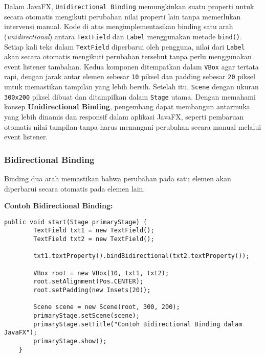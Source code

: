 Dalam JavaFX, \texttt{Unidirectional Binding} memungkinkan suatu properti untuk secara otomatis mengikuti perubahan nilai properti lain tanpa memerlukan intervensi manual. Kode di atas mengimplementasikan binding satu arah (\textit{unidirectional}) antara \texttt{TextField} dan \texttt{Label} menggunakan metode \texttt{bind()}. Setiap kali teks dalam \texttt{TextField} diperbarui oleh pengguna, nilai dari \texttt{Label} akan secara otomatis mengikuti perubahan tersebut tanpa perlu menggunakan event listener tambahan. Kedua komponen ditempatkan dalam \texttt{VBox} agar tertata rapi, dengan jarak antar elemen sebesar \texttt{10} piksel dan padding sebesar \texttt{20} piksel untuk memastikan tampilan yang lebih bersih. Setelah itu, \texttt{Scene} dengan ukuran \texttt{300x200} piksel dibuat dan ditampilkan dalam \texttt{Stage} utama. Dengan memahami konsep \textbf{Unidirectional Binding}, pengembang dapat membangun antarmuka yang lebih dinamis dan responsif dalam aplikasi JavaFX, seperti pembaruan otomatis nilai tampilan tanpa harus menangani perubahan secara manual melalui event listener.


\subsubsection{Bidirectional Binding}

Binding dua arah memastikan bahwa perubahan pada satu elemen akan diperbarui secara otomatis pada elemen lain.

\textbf{Contoh Bidirectional Binding:}
\begin{lstlisting}[style=JavaStyle, caption=Menghubungkan dua TextField secara bidirectional]
	public void start(Stage primaryStage) {
		TextField txt1 = new TextField();
		TextField txt2 = new TextField();
		
		txt1.textProperty().bindBidirectional(txt2.textProperty());
		
		VBox root = new VBox(10, txt1, txt2);
		root.setAlignment(Pos.CENTER);
		root.setPadding(new Insets(20));
		
		Scene scene = new Scene(root, 300, 200);
		primaryStage.setScene(scene);
		primaryStage.setTitle("Contoh Bidirectional Binding dalam JavaFX");
		primaryStage.show();
	}
\end{lstlisting}

